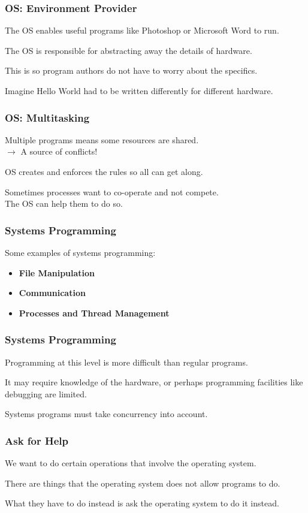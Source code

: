 \begin{frame}
\frametitle{OS: Environment Provider}

The OS enables useful programs like Photoshop or Microsoft Word to run. 

The OS is responsible for abstracting away the details of hardware.

This is so program authors do not have to worry about the specifics.

Imagine Hello World had to be written differently for different hardware.


\end{frame}

\begin{frame}
\frametitle{OS: Multitasking}
Multiple programs means some resources are shared.\\
\quad $\rightarrow$ A source of conflicts!

OS creates and enforces the rules so all can get along.

Sometimes processes want to co-operate and not compete.\\
\quad The OS can help them to do so.


\end{frame}

\begin{frame}
\frametitle{Systems Programming}

Some examples of systems programming:

\begin{itemize}
	\item \textbf{File Manipulation}
	\item \textbf{Communication}
	\item \textbf{Processes and Thread Management}
\end{itemize}

\end{frame}

\begin{frame}
\frametitle{Systems Programming}

Programming at this level is more difficult than regular programs. 

It may require knowledge of the hardware, or perhaps programming facilities like debugging are limited. 

Systems programs must take concurrency into account.

\end{frame}


\begin{frame}
\frametitle{Ask for Help}

We want to do certain operations that involve the operating system. 

There are things that the operating system does not allow programs to do. 

What they have to do instead is ask the operating system to do it instead. 

\end{frame}

